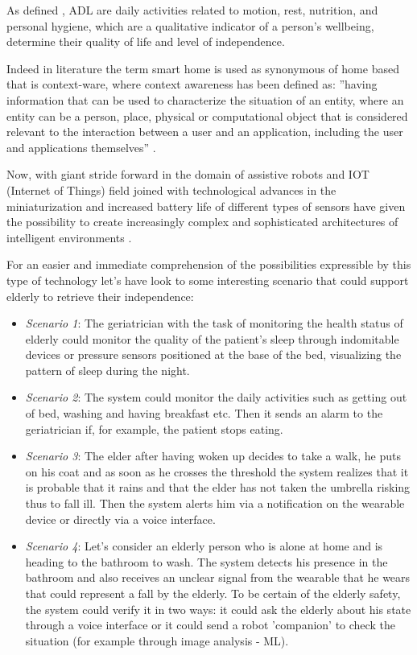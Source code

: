 \documentclass{thesisreport}
\begin{document}
 As defined \cite{buoncompagni2017towards}, ADL are daily activities related to motion, rest, nutrition, and personal hygiene, which are a qualitative indicator of a person’s wellbeing, determine their quality of life and level of independence. 
 
 Indeed in literature the term smart home is used as synonymous of home based that is context-ware, where context awareness has been defined as: ”having information that can be used to characterize the situation of an entity, where an entity can be a person, place, physical or computational object that is considered relevant to the interaction between a user and an application, including the user and applications themselves” \cite{abowd1999towards}. 

 Now, with giant stride forward in the domain of assistive robots and IOT (Internet of Things) field joined with technological advances in the miniaturization and increased battery life of different types of sensors have given the possibility to create increasingly complex and sophisticated architectures of intelligent environments \cite{phdthesis} \cite{nakashima2009handbook}.
 
 For an easier and immediate comprehension of the possibilities expressible by this type of technology let's have look to some interesting scenario that could support elderly to retrieve their independence:
 \begin{itemize}
     \item \textit{Scenario 1}: The geriatrician with the task of monitoring the health status of elderly could monitor the quality of the patient's sleep through indomitable devices or pressure sensors positioned at the base of the bed, visualizing the pattern of sleep during the night.
     \item \textit{Scenario 2}: The system could monitor the daily activities such as getting out of bed, washing and having breakfast etc. Then it sends an alarm to the geriatrician if, for example, the patient stops eating.
     \item \textit{Scenario 3}: The elder after having woken up decides to take a walk, he puts on his coat and as soon as he crosses the threshold the system realizes that it is probable that it rains and that the elder has not taken the umbrella risking thus to fall ill. Then the system alerts him via a notification on the wearable device or directly via a voice interface.
     \item \textit{Scenario 4}: Let's consider an elderly person who is alone at home  and is heading to the bathroom to wash. The system detects his presence in the bathroom and also receives an unclear signal from the wearable that he wears that could represent a fall by the elderly. To be certain of the elderly safety, the system could verify it  in two ways: it could ask the elderly about his state through a voice interface or it could send a robot 'companion' to check the situation (for example through image analysis - ML).
 \end{itemize}
 
\end{document}
